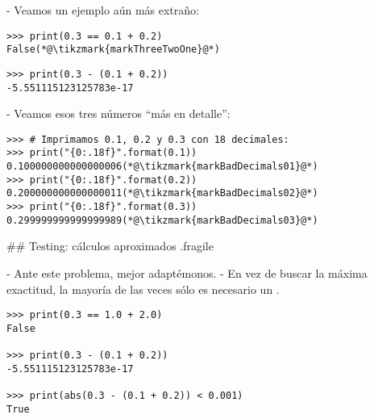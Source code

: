 
- Veamos un ejemplo aún más extraño:

\begin{lstlisting}
>>> print(0.3 == 0.1 + 0.2)
False(*@\tikzmark{markThreeTwoOne}@*)
\end{lstlisting}


\pause

\vspace{-2ex}
\begin{lstlisting}
>>> print(0.3 - (0.1 + 0.2))
-5.551115123125783e-17
\end{lstlisting}

- Veamos esos tres números ``más en detalle'':

\begin{lstlisting}
>>> # Imprimamos 0.1, 0.2 y 0.3 con 18 decimales:
>>> print("{0:.18f}".format(0.1))
0.100000000000000006(*@\tikzmark{markBadDecimals01}@*)
>>> print("{0:.18f}".format(0.2))
0.200000000000000011(*@\tikzmark{markBadDecimals02}@*)
>>> print("{0:.18f}".format(0.3))
0.299999999999999989(*@\tikzmark{markBadDecimals03}@*)
\end{lstlisting}



## Testing: cálculos aproximados {.fragile}


- Ante este problema, mejor adaptémonos.
- En vez de buscar la máxima exactitud, la mayoría de las veces sólo es necesario un .

\begin{lstlisting}
>>> print(0.3 == 1.0 + 2.0)
False

>>> print(0.3 - (0.1 + 0.2))
-5.551115123125783e-17

>>> print(abs(0.3 - (0.1 + 0.2)) < 0.001)
True
\end{lstlisting}
